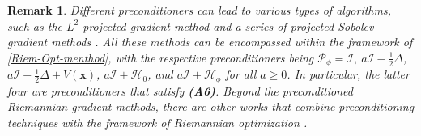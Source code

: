 \documentclass[preprint,3p]{elsarticle}
\newtheorem{remark}{Remark}[section]
\begin{document}
\begin{remark}\label{Proj-Sobo-Grad}
	Different preconditioners can lead to various types of algorithms, such as the $L^2$-projected gradient method \cite{2021Normalized} and a series of projected Sobolev gradient methods  \cite{2024On,2010A,2017Computation,2020Sobolev,2023The,2024Convergence,2010Tackling,2022Exp}. All these methods can be encompassed within the framework of \eqref{Riem-Opt-menthod}, with the respective preconditioners being \(\mathcal{P}_{\phi} = \mathcal{I},\ a\mathcal{I} - \frac{1}{2}\Delta\), \(a\mathcal{I} - \frac{1}{2}\Delta + V(\bm{x})\), \(a\mathcal{I} + \mathcal{H}_0\), and \(a\mathcal{I} + \mathcal{H}_{\phi}\) for all \(a \geq 0\). {In particular, the latter four are preconditioners that satisfy {\bf (A6)}. Beyond the preconditioned Riemannian gradient methods, there are other works that combine preconditioning techniques with the framework of Riemannian optimization \cite{2026JCAM,2024Riem,2017Efficient,2017Computation}}.
\end{remark}
\end{document}
